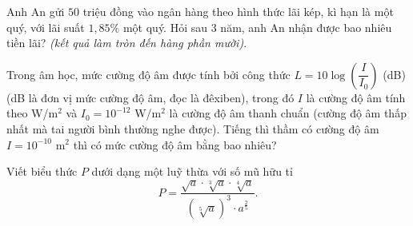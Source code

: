 \begin{ex}%
	Anh An gửi $50$ triệu đồng vào ngân hàng theo hình thức lãi kép, kì hạn là một quý, với lãi suất $1,85\%$ một quý. Hỏi sau 3 năm, anh An nhận được bao nhiêu tiền lãi? {\it (kết quả làm tròn đến hàng phần mười)}.
\end{ex}

\begin{ex}%
Trong âm học, mức cường độ âm được tính bởi công thức $ L=10\log\left(\dfrac{I}{I_0}\right)$ (dB) (dB là đơn vị mức cường độ âm, đọc là đêxiben), trong đó $I$ là cường độ âm tính theo  W/m$^2$ và $I_0=10^{-12}$ W/m$^2$ là cường độ âm thanh chuẩn (cường độ âm thấp nhất mà tai người bình thường nghe được). Tiếng thì thầm có cường độ âm $ I=10^{-10}$ m$^2$ thì có mức cường độ âm bằng bao nhiêu?
\end{ex}

\begin{ex}%
Viết biểu thức $P$ dưới dạng một luỹ thừa với số mũ hữu tỉ $$P=\dfrac{\sqrt{a}\cdot\sqrt[3]{a}\cdot\sqrt[4]{a}}{\left(\sqrt[5]{a}\right)^3\cdot a^{\tfrac{2}{5}}}.$$
\end{ex}

